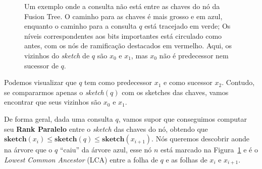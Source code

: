 \begin{figure}[h]
\caption{Um exemplo onde a consulta não está entre as chaves do nó da Fusion
Tree. O caminho para as chaves é mais grosso e em azul, enquanto o caminho para
a consulta $q$ está tracejado em verde; Os níveis correspondentes aos bits
importantes está circulado como antes, com os nós de ramificação destacados em
vermelho. Aqui, os vizinhos do \textit{sketch} de $q$ são $x_0$ e $x_1$, mas
$x_0$ não é predecessor nem sucessor de $q$.\label{f:fusion-query-search}}
\end{figure}

Podemos visualizar que $q$ tem como predecessor $x_1$ e como sucessor $x_2$.
Contudo, se compararmos apenas o \textit{sketch}$(q)$ com os sketches das
chaves, vamos encontrar que seus vizinhos são $x_0$ e $x_1$.

\enlargethispage{-4\baselineskip}

De forma geral, dada uma consulta $q$, vamos supor que conseguimos computar seu
\textbf{Rank Paralelo} entre o \textit{sketch} das chaves do nó, obtendo que
$\textbf{sketch}(x_i)\leq \textbf{sketch}(q) \leq \textbf{sketch}(x_{i+1})$. Nós
queremos descobrir aonde na árvore que o $q$ ``caiu'' da árvore azul, esse nó
$n$ está marcado na Figura~\ref{f:fusion-query-search} e é o \textit{Lowest
Common Ancestor} (LCA) entre a folha de $q$ e as folhas de $x_i$ e $x_{i+1}$.

